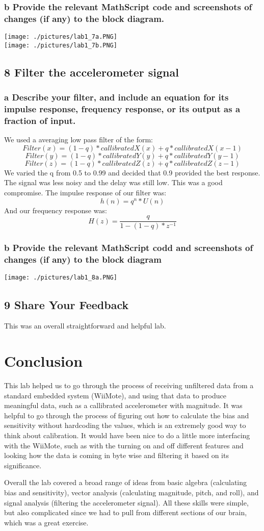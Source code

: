 \documentclass[10pt,a4paper]{article}
\begin{document}
    \subsubsection*{b Provide the relevant MathScript code and screenshots of changes (if any) to the block diagram.}
    \texttt{[image: ./pictures/lab1\_7a.PNG]} \\[1em] 
    \texttt{[image: ./pictures/lab1\_7b.PNG]} 
  \subsection*{8 Filter the accelerometer signal}
    \subsubsection*{a Describe your filter, and include an equation for its impulse response, frequency response, or its output as a fraction of input.}
      We used a averaging low pass filter of the form:
        \[Filter(x) = (1 - q)*callibratedX(x) + q*callibratedX(x-1)\]
        \[Filter(y) = (1 - q)*callibratedY(y) + q*callibratedY(y-1)\]
        \[Filter(z) = (1 - q)*callibratedZ(z) + q*callibratedZ(z-1)\]
      We varied the q from 0.5 to 0.99 and decided that 0.9 provided the best response. The signal was less noisy and the delay was still low. This was a good compromise. 
      The impulse response of our filter was:
        \[h(n) = q^n*U(n)\]
      And our frequency response was:
        \[H(z) = \frac{q}{1 - (1 - q)*z^{-1}}\]
    \subsubsection*{b Provide the relevant MathScript codd and screenshots of changes (if any) to the block diagram}
      \texttt{[image: ./pictures/lab1\_8a.PNG]} 
  \subsection*{9 Share Your Feedback}
    This was an overall straightforward and helpful lab.
\section*{Conclusion}
  This lab helped us to go through the process of receiving unfiltered data from a standard embedded system (WiiMote), and using that data to produce meaningful data, such as a callibrated accelerometer with magnitude. It was helpful to go through the process of figuring out how to calculate the bias and sensitivity without hardcoding the values, which is an extremely good way to think about calibration. It would have been nice to do a little more interfacing with the WiiMote, such as with the turning on and off different features and looking how the data is coming in byte wise and filtering it based on its significance.
  
  Overall the lab covered a broad range of ideas from basic algebra (calculating bias and sensitivity), vector analysis (calculating magnitude, pitch, and roll), and signal analysis (filtering the accelerometer signal). All these skills were simple, but also complicated since we had to pull from different sections of our brain, which was a great exercise. 
\end{document}
